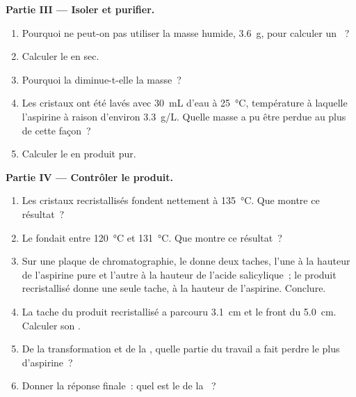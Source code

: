 \begin{problem}
\medskip
\noindent\textbf{Partie III --- Isoler et purifier.}
\begin{enumerate}[resume]
  \item Pourquoi ne peut-on pas utiliser la masse humide, \qty{3.6}{g},
        pour calculer un ~?
  \item Calculer le  en  sec.
  \item Pourquoi la  diminue-t-elle la masse~?
  \item Les cristaux ont été lavés avec \qty{30}{mL} d'eau à
        \qty{25}{\celsius}, température à laquelle l'aspirine 
        à raison d'environ \qty{3.3}{g/L}. Quelle masse a pu être perdue
        au plus de cette façon~?
  \item Calculer le  en produit pur.
\end{enumerate}

\medskip
\noindent\textbf{Partie IV --- Contrôler le produit.}
\begin{enumerate}[resume]
  \item Les cristaux recristallisés fondent nettement à
        \qty{135}{\celsius}. Que montre ce résultat~?
  \item Le  fondait entre \qty{120}{\celsius} et
        \qty{131}{\celsius}. Que montre ce résultat~?
  \item Sur une plaque de chromatographie, le  donne deux
        taches, l'une à la hauteur de l'aspirine pure et l'autre à la
        hauteur de l'acide salicylique~; le produit recristallisé donne
        une seule tache, à la hauteur de l'aspirine. Conclure.
  \item La tache du produit recristallisé a parcouru \qty{3.1}{cm} et le
        front du  \qty{5.0}{cm}. Calculer son .
  \item De la transformation et de la , quelle partie
        du travail a fait perdre le plus d'aspirine~?
  \item Donner la réponse finale~: quel est le  de la
        ~?
\end{enumerate}
\end{problem}
